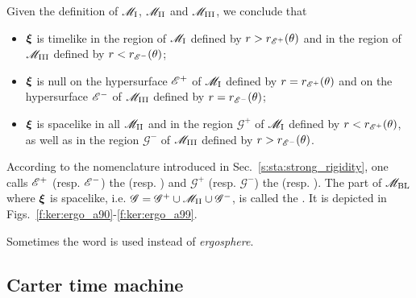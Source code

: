 Given the definition of $\mathscr{M}_{\rm I}$, $\mathscr{M}_{\rm II}$ and $\mathscr{M}_{\rm III}$, we conclude that
\begin{itemize}
\item $\bm{\xi}$ is timelike in the region of $\mathscr{M}_{\rm I}$ defined by $r>r_{\mathscr{E}^+}(\theta)$
and in the region of $\mathscr{M}_{\rm III}$ defined by $r<r_{\mathscr{E}^-}(\theta)$;
\item $\bm{\xi}$ is null on the hypersurface $\mathscr{E}^+$ of $\mathscr{M}_{\rm I}$ defined by
$r=r_{\mathscr{E}^+}(\theta)$
and on the hypersurface $\mathscr{E}^-$ of $\mathscr{M}_{\rm III}$ defined by $r=r_{\mathscr{E}^-}(\theta)$;
\item $\bm{\xi}$ is spacelike in all $\mathscr{M}_{\rm II}$ and in the region
$\mathscr{G}^+$ of $\mathscr{M}_{\rm I}$
defined by $r<r_{\mathscr{E}^+}(\theta)$, as well as
in the region $\mathscr{G}^-$ of $\mathscr{M}_{\rm III}$ defined by $r>r_{\mathscr{E}^-}(\theta)$.
\end{itemize}
According to the nomenclature introduced in Sec.~\ref{s:sta:strong_rigidity},
one calls $\mathscr{E}^+$ (resp. $\mathscr{E}^-$) the
(resp. )
and $\mathscr{G}^+$ (resp. $\mathscr{G}^-$) the
(resp. ).
The part of $\mathscr{M}_{\rm BL}$ where $\bm{\xi}$ is spacelike, i.e.
$\mathscr{G} = \mathscr{G}^+ \cup \mathscr{M}_{\rm II} \cup \mathscr{G}^-$,
is called the .
It is depicted in Figs.~\ref{f:ker:ergo_a90}-\ref{f:ker:ergo_a99}.
\begin{remark}
Sometimes the word  is used instead of
\emph{ergosphere}.
\end{remark}


\subsection{Carter time machine} \label{s:ker:time_machine}

